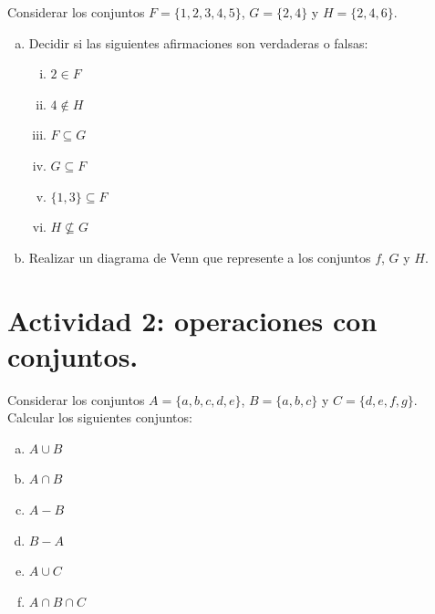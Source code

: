 \documentclass[11pt]{article}
\begin{document}
\begin{exercise}
    Considerar los conjuntos $F = \{1, 2, 3, 4, 5\}$, $G = \{2, 4\}$ y $H = \{2, 4, 6\}$.
    \begin{enumerate}[a)]
        \item Decidir si las siguientes afirmaciones son verdaderas o falsas:
            \begin{multicols}{3}
                \begin{enumerate}[i)]
                    \item $2 \in F$
                    \item $4 \notin H$
                    \item $F \subseteq G$
                    \item $G \subseteq F$
                    \item $\{1, 3\} \subseteq F$
                    \item $H \nsubseteq G$
                \end{enumerate}
            \end{multicols}
        \item Realizar un diagrama de Venn que represente a los conjuntos $f$, $G$ y $H$.
    \end{enumerate}
\end{exercise}

\section*{Actividad 2: operaciones con conjuntos.}

\begin{exercise}
    Considerar los conjuntos $A = \{a, b, c, d, e\}$, $B = \{a, b, c\}$ y $C = \{d, e, f, g\}$. Calcular los siguientes conjuntos:
    \begin{multicols}{6}
        \begin{enumerate}[a)]
            \item $A \cup B$
            \item $A \cap B$
            \item $A - B$
            \item $B - A$
            \item $A \cup C$
            \item $A\cap B \cap C$
        \end{enumerate}
    \end{multicols}
\end{exercise}
\end{document}
